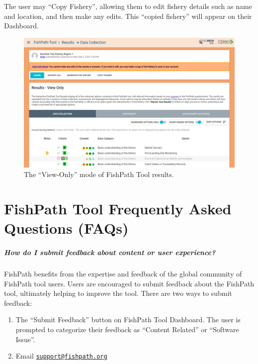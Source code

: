 \documentclass[
  11pt,
]{book}
\providecommand{\tightlist}{%
  \setlength{\itemsep}{0pt}\setlength{\parskip}{0pt}}
\begin{document}
The user may ``Copy Fishery'', allowing them to edit fishery details such as name and location, and then make any edits. This ``copied fishery'' will appear on their Dashboard.

\begin{figure}

{\centering \includegraphics[width=0.95\linewidth]{images/view-only} 

}

\caption{The “View-Only” mode of FishPath Tool results.}\label{fig:view-only}
\end{figure}

\hypertarget{appendix-appendix}{%
\appendix}


\hypertarget{fishpath-tool-frequently-asked-questions-faqs}{%
\chapter{FishPath Tool Frequently Asked Questions (FAQs)}\label{fishpath-tool-frequently-asked-questions-faqs}}

\hypertarget{faq-feedback}{%
\paragraph{How do I submit feedback about content or user experience?}\label{faq-feedback}}

FishPath benefits from the expertise and feedback of the global community of FishPath tool users. Users are encouraged to submit feedback about the FishPath tool, ultimately helping to improve the tool. There are two ways to submit feedback:

\begin{enumerate}
\def\labelenumi{\arabic{enumi}.}
\tightlist
\item
  The ``Submit Feedback'' button on FishPath Tool Dashboard. The user is prompted to categorize their feedback as ``Content Related'' or ``Software Issue''.
\item
  Email \href{mailto:support@fishpath.org}{\nolinkurl{support@fishpath.org}}
\end{enumerate}
\end{document}

